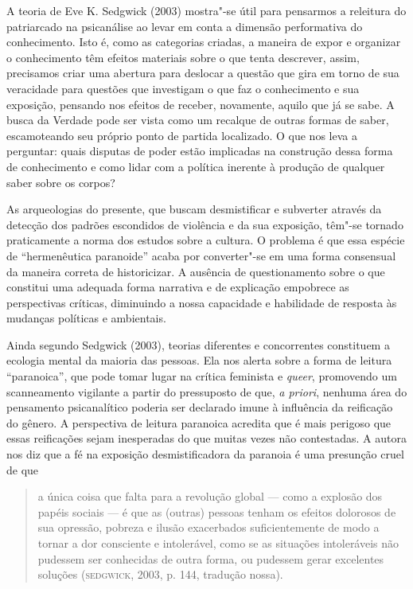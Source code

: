 A teoria de Eve K. Sedgwick (2003) mostra"-se útil para pensarmos a
releitura do patriarcado na psicanálise ao levar em conta a dimensão
performativa do conhecimento. Isto é, como as categorias criadas, a
maneira de expor e organizar o conhecimento têm efeitos materiais sobre
o que tenta descrever, assim, precisamos criar uma abertura para
deslocar a questão que gira em torno de sua veracidade para questões que
investigam o que faz o conhecimento e sua exposição, pensando nos
efeitos de receber, novamente, aquilo que já se sabe. A busca da Verdade
pode ser vista como um recalque de outras formas de saber, escamoteando
seu próprio ponto de partida localizado. O que nos leva a perguntar:
quais disputas de poder estão implicadas na construção dessa forma de
conhecimento e como lidar com a política inerente à produção de qualquer
saber sobre os corpos?

As arqueologias do presente, que buscam desmistificar e subverter
através da detecção dos padrões escondidos de violência e da sua
exposição, têm"-se tornado praticamente a norma dos estudos sobre a
cultura. O problema é que essa espécie de ``hermenêutica paranoide''
acaba por converter"-se em uma forma consensual da maneira correta de
historicizar. A ausência de questionamento sobre o que constitui uma
adequada forma narrativa e de explicação empobrece as perspectivas
críticas, diminuindo a nossa capacidade e habilidade de resposta às
mudanças políticas e ambientais.

Ainda segundo Sedgwick (2003), teorias diferentes e concorrentes
constituem a ecologia mental da maioria das pessoas. Ela nos alerta
sobre a forma de leitura ``paranoica'', que pode tomar lugar na crítica
feminista e \emph{queer}, promovendo um scanneamento vigilante a partir do
pressuposto de que, \emph{a priori}, nenhuma área do pensamento
psicanalítico poderia ser declarado imune à influência da reificação do
gênero. A perspectiva de leitura paranoica acredita que é mais perigoso
que essas reificações sejam inesperadas do que muitas vezes não
contestadas. A autora nos diz que a fé na exposição desmistificadora da
paranoia é uma presunção cruel de que

\begin{quote}
a única coisa que falta para a revolução global --- como a explosão dos
papéis sociais --- é que as (outras) pessoas tenham os efeitos dolorosos
de sua opressão, pobreza e ilusão exacerbados suficientemente de modo a
tornar a dor consciente e intolerável, como se as situações intoleráveis
não pudessem ser conhecidas de outra forma, ou pudessem gerar excelentes
soluções (\textsc{sedgwick}, 2003, p. 144, tradução nossa).
\end{quote}

